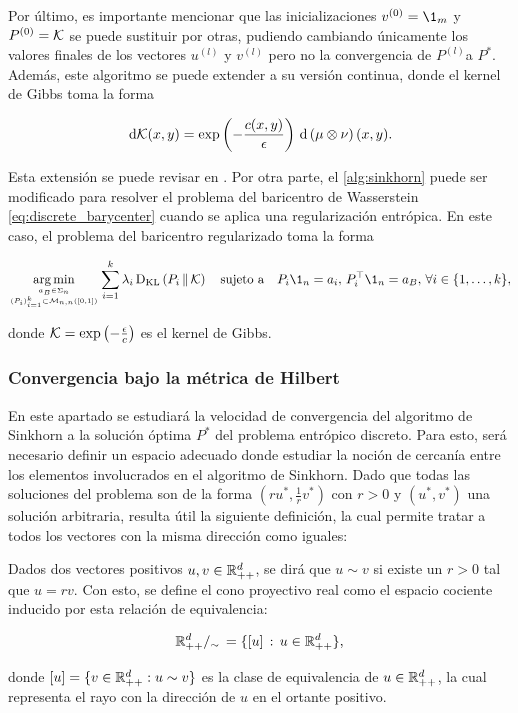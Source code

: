 Por último, es importante mencionar que las inicializaciones $v^{(0)} = \1_m$ y $P^{(0)}=\mathcal{K}$ se puede sustituir por otras, pudiendo cambiando únicamente los valores finales de los vectores $u^{(l)}$ y $v^{(l)}$ pero no la convergencia de $P^{(l)} $a $P^*$. Además, este algoritmo se puede extender a su versión continua, donde el kernel de Gibbs toma la forma

\begin{equation*}
	\,\operatorname{d}\!\mathcal{K}(x,y) = \exp\left(-\frac{c(x,y)}{\epsilon}\right)\,\operatorname{d}\!\,\left(\mu\otimes\nu\right)(x,y).
\end{equation*}

Esta extensión se puede revisar en \cite{nutz2022introduction}. Por otra parte, el \autoref{alg:sinkhorn} puede ser modificado para resolver el problema del baricentro de Wasserstein \eqref{eq:discrete_barycenter} cuando se aplica una regularización entrópica. En este caso, el problema del baricentro regularizado toma la forma

\begin{equation*}
	\argmin_{\feasible{a_B\in\Sigma_n}{(P_i)_{i=1}^k\subset \matrixspace{n,n}{[0,1]}}}
	\sum_{i=1}^k \lambda_i \KL{P_i}{\gibbs}
	\quad\text{sujeto a}\quad
	P_i\1_n = a_i,\, P_i^\top \1_n = a_B,\,\forall i\in\{1,\ldots,k\},
\end{equation*}

donde $\mathcal{K}=\exp\left(-\frac{\epsilon}{c}\right)$ es el kernel de Gibbs.


\subsubsection{Convergencia bajo la métrica de Hilbert}

En este apartado se estudiará la velocidad de convergencia del algoritmo de Sinkhorn a la solución óptima $P^*$ del problema entrópico discreto. Para esto, será necesario definir un espacio adecuado donde estudiar la noción de cercanía entre los elementos involucrados en el algoritmo de Sinkhorn. Dado que todas las soluciones del problema son de la forma $(ru^*, \frac{1}{r}v^*)$ con $r>0$ y $(u^*,v^*)$ una solución arbitraria, resulta útil la siguiente definición, la cual permite tratar a todos los vectores con la misma dirección como iguales:

\begin{defn}
	\label{defn:projective_cone}
	Dados dos vectores positivos $u,v\in\mathbb{R}^d_{++}$, se dirá que $u\sim v$ si existe un $r>0$ tal que $u=rv$. Con esto, se define el cono proyectivo real como el espacio cociente inducido por esta relación de equivalencia:

	\begin{equation*}
		\mathbb{R}^{d}_{++}/_\sim\, = \{[u]\,:\, u\in\mathbb{R}^d_{++}\},
	\end{equation*}

	donde $[u]=\{v\in\mathbb{R}_{++}^d:u\sim v\}$ es la clase de equivalencia de $u\in\mathbb{R}^d_{++}$, la cual representa el rayo con la dirección de $u$ en el ortante positivo.
\end{defn}

